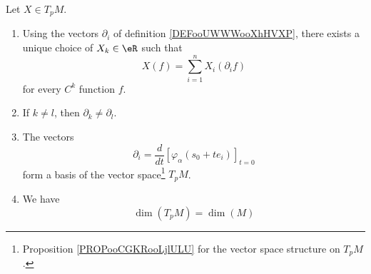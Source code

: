 \begin{proposition} \label{PROPooAAAXooKAMsfK}
	Let \( X\in T_pM\).
	\begin{enumerate}
		\item
		      Using the vectors \( \partial_i\) of definition \ref{DEFooUWWWooXhHVXP}, there exists a unique choice of \( X_k\in \eR\) such that
		      \begin{equation}
			      X(f)=\sum_{i=1}^n X_i(\partial_if)
		      \end{equation}
		      for every \( C^k\) function \( f\).
		\item		\label{ITEMooLWEHooRQwZQW}
		      If \( k\neq l\), then \( \partial_k\neq \partial_l\).
		\item		\label{ITEMooJRPCooOGopSu}
		      The vectors
		      \begin{equation}
			      \partial_i=\frac{d}{dt} \left[ \varphi_{\alpha}(s_0+te_i)  \right]_{t=0}
		      \end{equation}
		      form a basis of the vector space\footnote{Proposition \ref{PROPooCGKRooLjlULU} for the vector space structure on \( T_pM\).} \( T_pM\).
		\item		\label{ITEMooPJHVooOHNSNP}
		      We have
		      \begin{equation}
			      \dim(T_pM)=\dim(M)
		      \end{equation}
	\end{enumerate}
\end{proposition}


